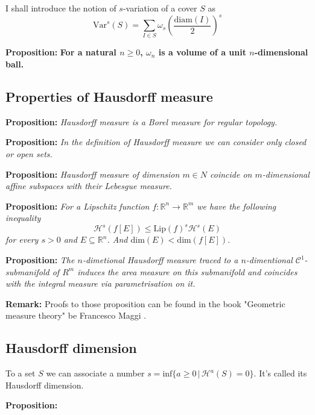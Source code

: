 \documentclass{article}
\begin{document}
I shall introduce the notion of $s$-variation of a cover $S$ as
\[\text{Var}^s(S)=\sum_{I\in S}\omega_s\left(\frac{\text{diam}(I)}{2}\right)^s\]

\textbf{Proposition:} \textbf{For a natural $n\geq 0$, $\omega_n$ is a volume of a unit
$n$-dimensional ball.}
\vspace{1ex}

\subsection{Properties of Hausdorff measure}

\textbf{Proposition:} \textit{Hausdorff measure is a Borel measure for regular topology.}

\vspace{1ex}
\textbf{Proposition:} \textit{In the definition of Hausdorff measure we can consider
only closed or open sets.}

\vspace{1ex}
\textbf{Proposition:} \textit{Hausdorff measure of dimension $m\in N$ coincide on
$m$-dimensional affine subspaces with their Lebesgue measure.}

\vspace{1ex}
\textbf{Proposition:} \textit{For a Lipschitz function $f:\mathbb{R}^n\rightarrow
\mathbb{R}^m$ we have the following inequality
\[ \mathcal{H}^s(f[E])\leq\text{Lip}(f)^s\mathcal{H}^s(E) \]
for every $s>0$ and $E\subseteq\mathbb{R}^n$. And $\text{dim}(E)<\text{dim}(f[E])$.}

\vspace{1ex}
\textbf{Proposition:} \textit{The $n$-dimetional Hausdorff measure traced to a
$n$-dimentional $\mathcal{C}^1$-submanifold of $R^m$ induces the area measure
on this submanifold and coincides with the integral measure via parametrisation
on it.}

\vspace{1ex}
\textbf{Remark:} Proofs to those proposition can be found in the book "Geometric
measure theory" be Francesco Maggi \cite{maggi}.
\subsection{Hausdorff dimension}

To a set $S$ we can associate a number $s=\text{inf}\{a\geq 0\,|\,\mathcal{H}^a
(S)=0\}$. It's called its Hausdorff dimension.

\vspace{1ex}
\textbf{Proposition:}
\end{document}

